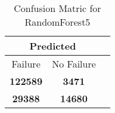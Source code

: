 \begin{table}[] 
\caption{Confusion Matric for RandomForest5} 
\label{Table: Prediction Accuracy-DMDRandomForest5OnlySunEKF-resetReflection-Reflection} 
\centering 
\begin{tabular} 
 {@{}ccc@{}} 
\toprule 
\multicolumn{2}{c}{\textbf{Predicted}}
 \\ \midrule 
\multicolumn{1}{|c|}{Failure} & 
\multicolumn{1}{c|}{No Failure}
 \\ \midrule 
\multicolumn{1}{|c|}{\color{green}\textbf{122589}} & 
\multicolumn{1}{c|}{\color{red}\textbf{3471}}
 \\ \midrule 
\multicolumn{1}{|c|}{\color{red}\textbf{29388}} & 
\multicolumn{1}{c|}{\color{green}\textbf{14680}}
 \\ \bottomrule 
\end{tabular} 
\end{table} 
